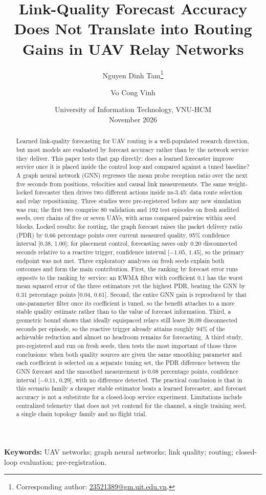 \documentclass[11pt,a4paper]{article}
\title{\textbf{Link-Quality Forecast Accuracy Does Not Translate
into Routing Gains in UAV Relay Networks}}
\author{Nguyen Dinh Tam\thanks{Corresponding author: \href{mailto:23521389@gm.uit.edu.vn}{23521389@gm.uit.edu.vn}.} \and Vo Cong Vinh}
\date{University of Information Technology, VNU-HCM\\November 2026}
\begin{document}
\maketitle
\begin{abstract}
Learned link-quality forecasting for UAV routing is a well-populated research
direction, but most models are evaluated by forecast accuracy rather than by
the network service they deliver. This paper tests that gap directly: does a
learned forecaster improve service once it is placed inside the control loop
and compared against a tuned baseline? A graph neural network (GNN) regresses
the mean probe reception ratio over the next five seconds from positions,
velocities and causal link measurements. The same weight-locked forecaster then
drives two different actions inside ns-3.45: data route selection and relay
repositioning. Three studies were pre-registered before any new simulation was
run; the first two comprise 80 validation and 192 test episodes on fresh audited seeds,
over chains of five or seven UAVs, with arms compared pairwise within seed
blocks. Locked results: for routing, the graph forecast raises the packet
delivery ratio (PDR) by 0.66 percentage points over current measured quality,
95\% confidence interval [0.38, 1.00]; for placement control, forecasting saves
only 0.20 disconnected seconds relative to a reactive trigger, confidence
interval [$-1.05$, $1.45$], so the primary endpoint was not met. Three
exploratory analyses on fresh seeds explain both outcomes and form the main
contribution. First, the ranking by forecast error runs \emph{opposite} to the
ranking by service: an EWMA filter with coefficient 0.1 has the worst mean
squared error of the three estimators yet the highest PDR, beating the GNN by
0.31 percentage points [0.04, 0.61]. Second, the entire GNN gain is reproduced
by that one-parameter filter once its coefficient is tuned, so the benefit
attaches to a more stable quality estimate rather than to the value of forecast
information. Third, a geometric bound shows that ideally equispaced relays
still leave 26.09 disconnected seconds per episode, so the reactive trigger
already attains roughly 94\% of the achievable reduction and almost no
headroom remains for forecasting. A third study, pre-registered and run on
fresh seeds, then tests the most important of those three conclusions: when both
quality sources are given the same smoothing parameter and each coefficient is
selected on a separate tuning set, the PDR difference between the GNN forecast
and the smoothed measurement is 0.08 percentage points, confidence interval
[$-0.11$, $0.29$], with no difference detected. The practical conclusion is that in this
scenario family a cheaper stable estimator beats a learned forecaster, and
forecast accuracy is not a substitute for a closed-loop service experiment.
Limitations include centralized telemetry that does not yet contend for the
channel, a single training seed, a single chain topology family and no flight
trial.
\end{abstract}
\noindent\textbf{Keywords:} UAV networks; graph neural networks; link quality;
routing; closed-loop evaluation; pre-registration.
\end{document}

